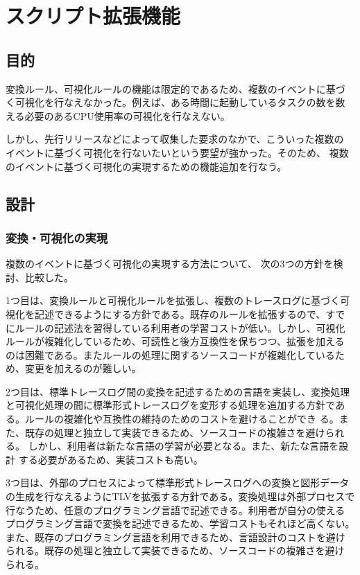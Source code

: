 \chapter{スクリプト拡張機能}\label{ch:se}

\section{目的}
変換ルール、可視化ルールの機能は限定的であるため、複数のイベントに基づ
く可視化を行なえなかった。例えば、ある時間に起動しているタスクの数を数
える必要のあるCPU使用率の可視化を行なえない。

しかし、先行リリースなどによって収集した要求のなかで、こういった複数の
イベントに基づく可視化を行ないたいという要望が強かった。そのため、
複数のイベントに基づく可視化の実現するための機能追加を行なう。

\section{設計}
\subsection{変換・可視化の実現}
複数のイベントに基づく可視化の実現する方法について、
次の3つの方針を検討、比較した。

1つ目は、変換ルールと可視化ルールを拡張し、複数のトレースログに基づく可
視化を記述できるようにする方針である。既存のルールを拡張するので、すで
にルールの記述法を習得している利用者の学習コストが低い。しかし、可視化
ルールが複雑化しているため、可読性と後方互換性を保ちつつ、拡張を加える
のは困難である。またルールの処理に関するソースコードが複雑化しているた
め、変更を加えるのが難しい。

2つ目は、標準トレースログ間の変換を記述するための言語を実装し、変換処理
と可視化処理の間に標準形式トレースログを変形する処理を追加する方針であ
る。ルールの複雑化や互換性の維持のためのコストを避けることができ
る。また、既存の処理と独立して実装できるため、ソースコードの複雑さを避けられる。
しかし、利用者は新たな言語の学習が必要となる。また、新たな言語を設計
する必要があるため、実装コストも高い。

3つ目は、外部のプロセスによって標準形式トレースログへの変換と図形データ
の生成を行なえるようにTLVを拡張する方針である。変換処理は外部プロセスで
行なうため、任意のプログラミング言語で記述できる。利用者が自分の使える
プログラミング言語で変換を記述できるため、学習コストもそれほど高くない。
また、既存のプログラミング言語を利用できるため、言語設計のコストを避け
られる。既存の処理と独立して実装できるため、ソースコードの複雑さを避け
られる。

